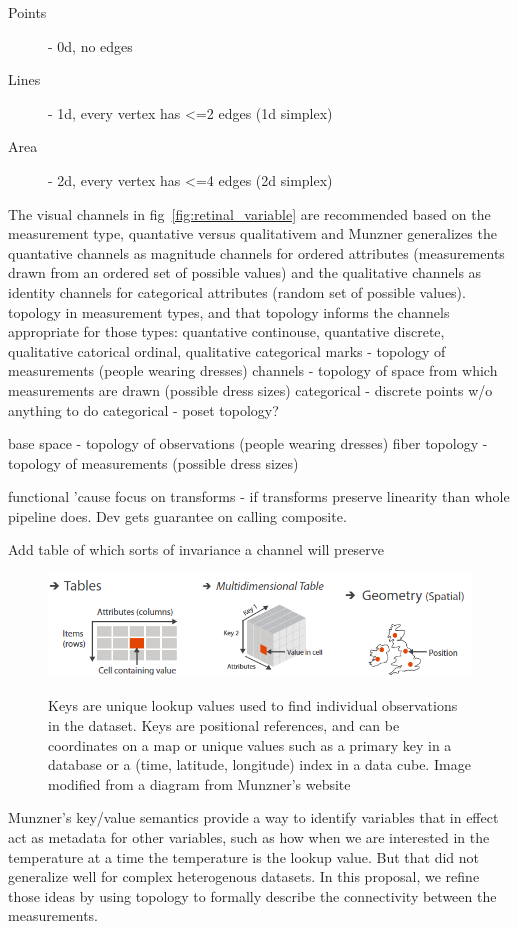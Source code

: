 \documentclass[letterpaper,onecolumn,titlepage]{Ythesis}
\begin{document}
\begin{description} 
    \item[Points] - 0d, no edges
    \item[Lines] - 1d, every vertex has <=2 edges (1d simplex)
    \item[Area] - 2d,  every vertex has <=4 edges (2d simplex)
\end{description}

The visual channels in fig~\ref{fig:retinal_variable} are recommended based on the measurement type, quantative versus qualitativem  and Munzner generalizes the quantative channels as magnitude channels for ordered attributes (measurements drawn from an ordered set of possible values) and the qualitative channels as identity channels for categorical attributes (random set of possible values). 
topology in measurement types, and that topology informs the channels appropriate for those types:
    quantative continouse, quantative discrete, qualitative catorical ordinal, qualitative categorical
    marks - topology of measurements (people wearing dresses)
    channels - topology of space from which measurements are drawn (possible dress sizes)
    categorical - discrete points w/o anything to do 
    categorical - poset topology?

    base space - topology of observations (people wearing dresses)
    fiber topology - topology of measurements (possible dress sizes) 

functional 'cause focus on transforms - if transforms preserve linearity than whole pipeline does. Dev gets guarantee on calling composite. 

Add table of which sorts of invariance a channel will preserve

\begin{figure}
    \includegraphics{figures/intro/munzner_datatypes}
    \label{fig:munzner_datatypes}
    \caption{Keys are unique lookup values used to find individual observations in the dataset. Keys are positional references, and can be coordinates on a map or unique values such as a primary key in a database or a (time, latitude, longitude) index in a data cube. Image modified from a diagram from Munzner's website\cite{munznerChDataAbstraction}}
\end{figure}
Munzner's key/value semantics\cite{munznerWhatDataAbstraction2014}
provide a way to identify variables that in effect act as metadata for other variables, such as how when we are interested in the temperature at a time the temperature is the lookup value. But that did not generalize well for complex heterogenous datasets. In this proposal, we refine those ideas by using topology to formally describe the connectivity between the measurements. 
\end{document}
